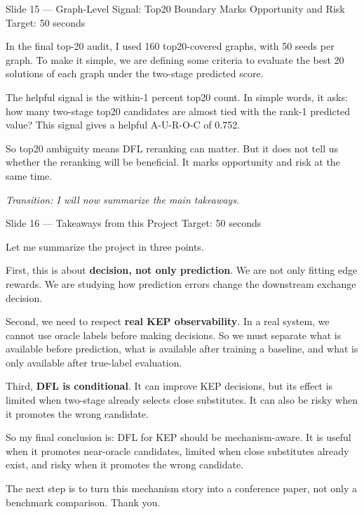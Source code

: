 \documentclass[11pt,aspectratio=169]{beamer}
\newcommand{\kw}[1]{\textcolor{navyblue}{\textbf{#1}}}
\newcommand{\tr}[1]{\vspace{0.35em}\textit{\textcolor{black!55}{Transition: #1}}}
\newcommand{\timing}[1]{\textcolor{black!45}{\scriptsize Target: #1}\par\vspace{0.25em}}
\begin{document}
\begin{frame}{Slide 15 \enspace\textmd{\small\textcolor{black!40}{--- Graph-Level Signal: Top20 Boundary Marks Opportunity and Risk}}}
\small
\timing{50 seconds}

In the final top-20 audit, I used 160 top20-covered graphs, with 50 seeds per graph. To make it simple, we are defining some criteria to evaluate the best 20 solutions of each graph under the two-stage predicted score. 

The helpful signal is the within-1 percent top20 count. In simple words, it asks: how many two-stage top20 candidates are almost tied with the rank-1 predicted value? This signal gives a helpful A-U-R-O-C of 0.752.

\vspace{0.35em}
So top20 ambiguity means DFL reranking can matter. But it does not tell us whether the reranking will be beneficial. It marks opportunity and risk at the same time.

\tr{I will now summarize the main takeaways.}
\end{frame}

\begin{frame}{Slide 16 \enspace\textmd{\small\textcolor{black!40}{--- Takeaways from this Project}}}
\small
\timing{50 seconds}

Let me summarize the project in three points.

\vspace{0.35em}
First, this is about \kw{decision, not only prediction}. We are not only fitting edge rewards. We are studying how prediction errors change the downstream exchange decision.

\vspace{0.35em}
Second, we need to respect \kw{real KEP observability}. In a real system, we cannot use oracle labels before making decisions. So we must separate what is available before prediction, what is available after training a baseline, and what is only available after true-label evaluation.

\vspace{0.35em}
Third, \kw{DFL is conditional}. It can improve KEP decisions, but its effect is limited when two-stage already selects close substitutes. It can also be risky when it promotes the wrong candidate.

\vspace{0.35em}
So my final conclusion is: DFL for KEP should be mechanism-aware. It is useful when it promotes near-oracle candidates, limited when close substitutes already exist, and risky when it promotes the wrong candidate.

\vspace{0.35em}
The next step is to turn this mechanism story into a conference paper, not only a benchmark comparison. Thank you.
\end{frame}
\end{document}
